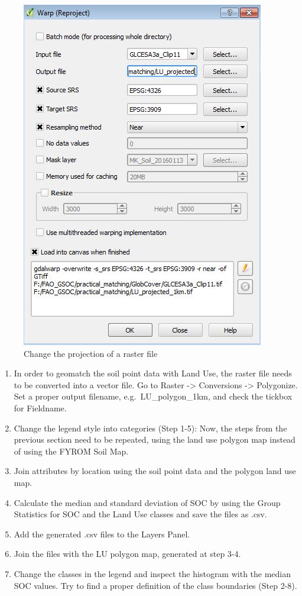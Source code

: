 \documentclass[10pt,b5paper,]{book}
\providecommand{\tightlist}{%
  \setlength{\itemsep}{0pt}\setlength{\parskip}{0pt}}
\theoremstyle{definition}
\theoremstyle{definition}
\theoremstyle{definition}
\theoremstyle{remark}
\begin{document}
\begin{figure}

{\centering \includegraphics[width=0.8\linewidth]{images/Conv_upscaling9} 

}

\caption{Change the projection of a raster file}\label{fig:unnamed-chunk-31}
\end{figure}

\begin{enumerate}
\def\labelenumi{\arabic{enumi}.}
\setcounter{enumi}{3}
\tightlist
\item
  In order to geomatch the soil point data with Land Use, the raster
  file needs to be converted into a vector file. Go to Raster
  -\textgreater{} Conversions -\textgreater{} Polygonize. Set a proper
  output filename, e.g.~LU\_polygon\_1km, and check the tickbox for
  Fieldname.
\item
  Change the legend style into categories (Step 1-5): Now, the steps
  from the previous section need to be repeated, using the land use
  polygon map instead of using the FYROM Soil Map.
\item
  Join attributes by location using the soil point data and the polygon
  land use map.
\item
  Calculate the median and standard deviation of SOC by using the Group
  Statistics for SOC and the Land Use classes and save the files as
  .csv.
\item
  Add the generated .csv files to the Layers Panel.
\item
  Join the files with the LU polygon map, generated at step 3-4.
\item
  Change the classes in the legend and inspect the histogram with the
  median SOC values. Try to find a proper definition of the class
  boundaries (Step 2-8).
\end{enumerate}
\end{document}
